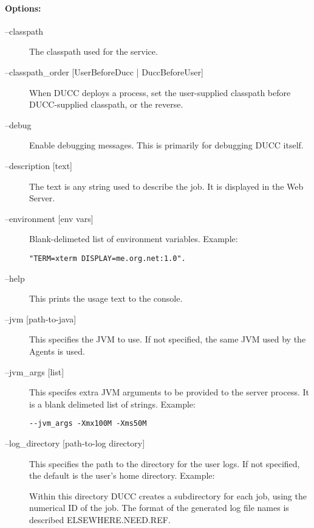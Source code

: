     \paragraph{Options:}
    \begin{description}

        \item[--classpath] The classpath used for the service.
          
        \item[--classpath\_order {[UserBeforeDucc | DuccBeforeUser]} ]
          When DUCC deploys a process, set the user-supplied classpath before DUCC-supplied
          classpath, or the reverse.
          
        \item[--debug ]
          Enable debugging messages. This is primarily for debugging DUCC itself. 
          
        \item[--description {[text]}] The text is any string used to describe the job. It is displayed
          in the Web Server.
          
        \item[--environment {[env vars]}] Blank-delimeted list of environment variables.  Example:
\begin{verbatim}
"TERM=xterm DISPLAY=me.org.net:1.0". 
\end{verbatim}

        \item[--help ]
        This prints the usage text to the console. 

      \item[--jvm {[path-to-java]}] This specifies the JVM to use. If not specified, the same JVM
        used by the Agents is used.

      \item[--jvm\_args {[list]} ]        
        This specifes extra JVM arguments to be provided to the server process. It is a blank delimeted 
        list of strings. Example: 
\begin{verbatim}
--jvm_args -Xmx100M -Xms50M 
\end{verbatim}

      \item[--log\_directory {[path-to-log directory]}] 
        This specifies the path to the directory for the user logs. If not specified, the default is the 
        user's home directory. Example: 

        Within this directory DUCC creates a subdirectory for each job, using the numerical 
        ID of the job. The format of the generated log file names is described ELSEWHERE.NEED.REF.


\end{description}
